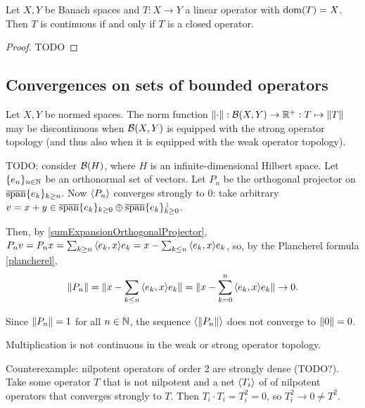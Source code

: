 \begin{theorem} \label{BanachClosedGraphTheorem}
Let $X,Y$ be Banach spaces and $T:X\to Y$ a linear operator with $\operatorname{dom}(T) = X$. Then $T$ is continuous \textup{if and only if} $T$ is a closed operator.
\end{theorem}
\begin{proof}
TODO
\end{proof}

\subsection{Convergences on sets of bounded operators}
\begin{example}
Let $X, Y$ be normed spaces. The norm function $\lVert\cdot\rVert: \operatorname{\mathcal{B}}(X,Y)\to \mathbb{R}^+: T\mapsto \lVert T\rVert$ may be discontinuous when $\operatorname{\mathcal{B}}(X,Y)$ is equipped with the strong operator topology (and thus also when it is equipped with the weak operator topology).

TODO: consider $\operatorname{\mathcal{B}}(H)$, where $H$ is an infinite-dimensional Hilbert space. Let $\{e_n\}_{n\in\mathbb{N}}$ be an orthonormal set of vectors. Let $P_n$ be the orthogonal projector on $\overline{\operatorname{span}}\{e_k\}_{k\geq n}$. Now $\left\langle P_n \right\rangle$ converges strongly to $0$:
take arbitrary $v = x+y \in \overline{\operatorname{span}}\{e_k\}_{k\geq 0} \oplus \overline{\operatorname{span}}\{e_k\}_{k\geq 0}^\perp$.

Then, by \ref{sumExpansionOrthogonalProjector}, $P_nv = P_nx = \sum_{k\geq n}\inner{e_k, x}e_k = x - \sum_{k\leq n}\inner{e_k, x}e_k$, so, by the Plancherel formula \ref{plancherel},
\[ \norm{P_n} = \norm{x - \sum_{k\leq n}\inner{e_k, x}e_k} = \norm{x - \sum_{k=0}^n\inner{e_k, x}e_k} \to 0. \]

Since $\lVert P_n\rVert = 1$ for all $n\in\mathbb{N}$, the sequence $\left\langle \lVert P_n\rVert \right\rangle$ does not converge to $\lVert0\rVert = 0$.
\end{example}

\begin{example}
Multiplication is not continuous in the weak or strong operator topology.

Counterexample: nilpotent operators of order 2 are strongly dense (TODO?). Take some operator $T$ that is not nilpotent and a net $\left\langle T_i \right\rangle$ of of nilpotent operators that converges strongly to $T$. Then $T_i\cdot T_i = T_i^2 = 0$, so $T_i^2 \to 0 \neq T^2$.
\end{example}

